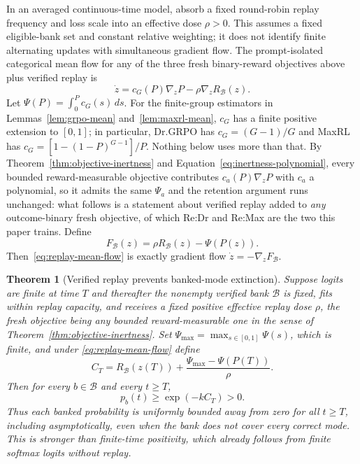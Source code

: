 \documentclass{article}
\newcommand{\enforcehalffinalproseline}{%
  \setlength{\parfillskip}{0pt plus .20\linewidth}}
\newcommand{\1}{\mathbf 1}
\newtheorem{theorem}[lemma]{Theorem}
\theoremstyle{remark}
\theoremstyle{definition}
\theoremstyle{plain}
\begin{document}
In an averaged continuous-time model, absorb a fixed round-robin replay
frequency and loss scale into an effective dose $\rho>0$. This assumes a
fixed eligible-bank set and constant relative weighting; it does not identify
finite alternating updates with simultaneous gradient flow. The prompt-isolated categorical mean flow for any of the three fresh
binary-reward objectives above plus verified replay is
\begin{equation}
  \dot z
  =c_G(P)\nabla_zP-\rho\nabla_zR_{\mathcal B}(z).
  \label{eq:replay-mean-flow}
\end{equation}
Let $\Psi(P)=\int_0^P c_G(s)\,ds$. For the finite-group estimators in Lemmas~\ref{lem:grpo-mean}
and~\ref{lem:maxrl-mean}, $c_G$ has a finite positive extension to $[0,1]$;
in particular, Dr.GRPO has $c_G=(G-1)/G$ and MaxRL has
$c_G=[1-(1-P)^{G-1}]/P$. Nothing below uses more than that. By
Theorem~\ref{thm:objective-inertness} and
Equation~\eqref{eq:inertness-polynomial}, every bounded reward-measurable
objective contributes $c_a(P)\nabla_zP$ with $c_a$ a polynomial, so it admits
the same $\Psi_a$ and the retention argument runs unchanged: what follows is a
statement about verified replay added to \emph{any} outcome-binary fresh
objective, of which Re:Dr and Re:Max are the two this paper trains. Define
\begin{equation}
  F_{\mathcal B}(z)=\rho R_{\mathcal B}(z)-\Psi(P(z)).
  \label{eq:replay-potential}
\end{equation}
Then~\eqref{eq:replay-mean-flow} is exactly gradient flow
$\dot z=-\nabla_zF_{\mathcal B}$.

\begin{theorem}[Verified replay prevents banked-mode extinction]
\enforcehalffinalproseline
\label{thm:replay-retention}
Suppose logits are finite at time $T$ and thereafter the nonempty verified
bank $\mathcal B$ is fixed, fits within replay capacity, and receives a
fixed positive effective replay dose $\rho$, the fresh objective being any
bounded reward-measurable one in the sense of
Theorem~\ref{thm:objective-inertness}. Set
$\Psi_{\max}=\max_{s\in[0,1]}\Psi(s)$, which is finite, and under
\eqref{eq:replay-mean-flow} define
\[
  C_T
  =R_{\mathcal B}(z(T))
   +\frac{\Psi_{\max}-\Psi(P(T))}{\rho}.
\]
Then for every $b\in\mathcal B$ and every $t\ge T$,
\begin{equation}
  p_b(t)\ge \exp(-kC_T)>0.
  \label{eq:replay-retention-bound}
\end{equation}
Thus each banked probability is uniformly bounded away from zero for all
$t\ge T$, including asymptotically, even when the bank does not cover every
correct mode. This is stronger than finite-time positivity, which already
follows from finite softmax logits without replay.
\end{theorem}
\end{document}
